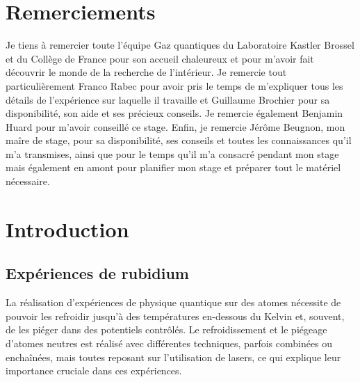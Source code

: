 \documentclass[11pt,a4paper] { article}
\begin{document}
\newpage

\thispagestyle{empty}
\section*{Remerciements}

Je tiens à remercier toute l'équipe Gaz quantiques du Laboratoire Kastler Brossel et du Collège de France pour son accueil chaleureux et pour m'avoir fait découvrir le monde de la recherche de l'intérieur. Je remercie tout particulièrement Franco Rabec pour avoir pris le temps de m'expliquer tous les détails de l'expérience sur laquelle il travaille et Guillaume Brochier pour sa disponibilité, son aide et ses précieux conseils. Je remercie également Benjamin Huard pour m'avoir conseillé ce stage. Enfin, je remercie Jérôme Beugnon, mon maîre de stage, pour sa disponibilité, ses conseils et toutes les connaissances qu'il m'a transmises, ainsi que pour le temps qu'il m'a consacré pendant mon stage mais également en amont pour planifier mon stage et préparer tout le matériel nécessaire. 
\tableofcontents
\newpage


\setcounter{page}{1}


\setlength{\parindent}{16pt}

\section{Introduction}


\subsection{Expériences de rubidium}

La réalisation d'expériences de physique quantique sur des atomes nécessite de pouvoir les refroidir jusqu'à des températures en-dessous du Kelvin et, souvent, de les piéger dans des potentiels contrôlés. Le refroidissement et le piégeage d'atomes neutres est réalisé avec différentes techniques, parfois combinées ou enchaînées, mais toutes reposant sur l'utilisation de lasers, ce qui explique leur importance cruciale dans ces expériences.
\end{document}
